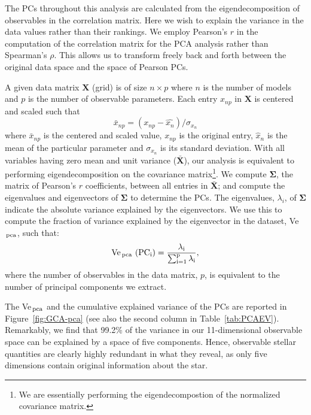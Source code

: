 The PCs throughout this analysis are calculated from the eigendecomposition of observables in the correlation matrix. Here we wish to explain the variance in the data values rather than their rankings. 
 We employ Pearson's $r$ in the computation of the correlation matrix for the PCA analysis rather than Spearman's $\rho$. This allows us to transform freely back and forth between the original data space and the space of Pearson PCs.  
 
A given data matrix $\mathbf{X}$ (grid) is of size $n \times p$ where $n$ is the number of models  and $p$ is the number of observable parameters. 
Each entry $x_{np}$ in $\mathbf{X}$ is centered and scaled such that 
\begin{equation}
\bar{x}_{np} = (x_{np} -\hat{x_n})/\sigma_{x_n}
\end{equation}
where $\bar{x}_{np}$ is the centered and scaled value,  $x_{np}$ is the original entry, $\hat{x}_n$ is the mean of the particular parameter and $\sigma_{x_n}$ is its standard deviation. 
With all variables having zero mean and unit variance ($\mathbf{\bar{X}}$), our analysis is equivalent to performing eigendecomposition on the covariance matrix\footnote{We are essentially performing the eigendecompostion of the normalized covariance matrix.}. 
We compute $\boldsymbol\Sigma$, the matrix of Pearson's $r$  coefficients, between all entries in $\mathbf{\bar{X}}$; and compute the eigenvalues and eigenvectors of $\boldsymbol\Sigma$ to determine the PCs.
The eigenvalues, $\lambda_i$, of $\boldsymbol\Sigma$ indicate the absolute variance explained by the eigenvectors. We use this to compute the fraction of variance explained by the eigenvector in the dataset, Ve$_{\, \rm{pca}}$, such that:
\begin{equation}
\rm{Ve}_{\, \rm{pca}} \ (\rm{PC}_i)=\frac{\lambda_i}{\sum_{i=1}^p \lambda_i}, 
\label{eqn:pcaev}
\end{equation}
where the number of observables in the data matrix, $p$, is equivalent to the number of principal components we extract.




The Ve$_{\,\rm{pca}}$ and the cumulative explained variance of the PCs are reported in Figure~\ref{fig:GCA-pca} (see also the second column in Table~\ref{tab:PCAEV}).
Remarkably, we find that 99.2\% of the variance in our 11-dimensional observable space can be explained by a space of five components.
Hence, observable stellar quantities are clearly highly redundant in what they reveal, as only five dimensions contain original information about the star. 


